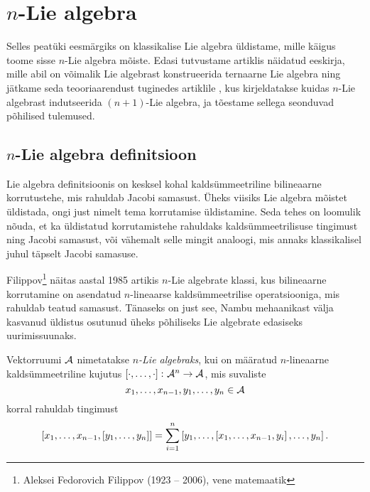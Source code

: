 

\section{\texorpdfstring{$n$}\ -Lie algebra}

Selles peatüki eesmärgiks on klassikalise Lie algebra
üldistame, mille käigus toome sisse $n$-Lie algebra mõiste.
Edasi tutvustame artiklis \cite{AMS:2011} näidatud eeskirja,
mille abil on võimalik Lie algebrast konstrueerida
ternaarne Lie algebra ning jätkame seda teooriaarendust
tuginedes artiklile \cite{AKMS:2014}, kus kirjeldatakse
kuidas $n$-Lie algebrast indutseerida $(n+1)$-Lie algebra, ja
tõestame sellega seonduvad põhilised tulemused.

\subsection{\texorpdfstring{$n$}\ -Lie algebra definitsioon}

Lie algebra definitsioonis on kesksel kohal kaldsümmeetriline
bilineaarne korrutustehe, mis rahuldab Jacobi samasust.
Üheks viisiks Lie algebra mõistet üldistada, ongi just nimelt
tema korrutamise üldistamine. Seda tehes on loomulik nõuda, et
ka üldistatud korrutamistehe rahuldaks kaldsümmeetrilisuse
tingimust ning Jacobi samasust, või vähemalt selle mingit
analoogi, mis annaks klassikalisel juhul täpselt
Jacobi samasuse.

Filippov\footnote{Aleksei Fedorovich Filippov (1923 -- 2006),
vene matemaatik} näitas aastal 1985 artikis \cite{filippov1985}
$n$-Lie algebrate klassi, kus bilineaarne korrutamine on
asendatud $n$-lineaarse kaldsümmeetrilise operatsiooniga,
mis rahuldab teatud samasust.\cite{kasymov1987}
Tänaseks on just see, Nambu mehaanikast välja kasvanud
üldistus osutunud üheks põhiliseks Lie algebrate edasiseks
uurimissuunaks.

\begin{dfn}
    Vektorruumi $\mathcal{A}$ nimetatakse \emph{$n$-Lie algebraks}, kui
    on määratud $n$-lineaarne kaldsümmeetriline kujutus
    $\left[ \cdot, \dots, \cdot \right] \colon \mathcal{A}^n \to \mathcal{A}$, mis
    suvaliste
    \[ x_1, \dots, x_{n-1}, y_1, \dots, y_n \in \mathcal{A} \]
    korral rahuldab tingimust
    \begin{align}\label{id:filippov}
        \left[ x_1, \dots, x_{n-1}, \left[ y_1, \dots, y_n \right] \right] =
        \sum_{i=1}^n \left[
            y_1, \dots, \left[ x_1, \dots, x_{n-1}, y_i \right], \dots, y_n
        \right].
    \end{align}
\end{dfn}


